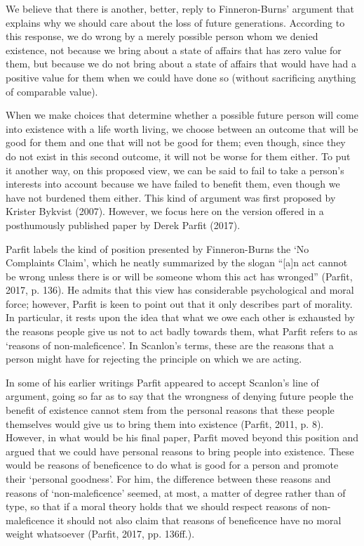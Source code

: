 \documentclass[man,11pt,a4paper]{apa7}
\begin{document}
We believe that there is another, better, reply to Finneron-Burns' argument that explains why we should care about the loss of future generations. According to this response, we do wrong by a merely possible person whom we denied existence, not because we bring about a state of affairs that has zero value for them, but because we do not bring about a state of affairs that would have had a positive value for them when we could have done so (without sacrificing anything of comparable value).

When we make choices that determine whether a possible future person will come into existence with a life worth living, we choose between an outcome that will be good for them and one that will not be good for them; even though, since they do not exist in this second outcome, it will not be worse for them either. To put it another way, on this proposed view, we can be said to fail to take a person's interests into account because we have failed to benefit them, even though we have not burdened them either. This kind of argument was first proposed by Krister Bykvist (2007). However, we focus here on the version offered in a posthumously published paper by Derek Parfit (2017).

Parfit labels the kind of position presented by Finneron-Burns the `No Complaints Claim', which he neatly summarized by the slogan ``[a]n act cannot be wrong unless there is or will be someone whom this act has wronged'' (Parfit, 2017, p. 136). He admits that this view has considerable psychological and moral force; however, Parfit is keen to point out that it only describes part of morality. In particular, it rests upon the idea that what we owe each other is exhausted by the reasons people give us not to act badly towards them, what Parfit refers to as `reasons of non-maleficence'. In Scanlon's terms, these are the reasons that a person might have for rejecting the principle on which we are acting.

In some of his earlier writings Parfit appeared to accept Scanlon's line of argument, going so far as to say that the wrongness of denying future people the benefit of existence cannot stem from the personal reasons that these people themselves would give us to bring them into existence (Parfit, 2011, p. 8). However, in what would be his final paper, Parfit moved beyond this position and argued that we could have personal reasons to bring people into existence. These would be reasons of beneficence to do what is good for a person and promote their `personal goodness'. For him, the difference between these reasons and reasons of `non-maleficence' seemed, at most, a matter of degree rather than of type, so that if a moral theory holds that we should respect reasons of non-maleficence it should not also claim that reasons of beneficence have no moral weight whatsoever (Parfit, 2017, pp. 136ff.).
\end{document}
